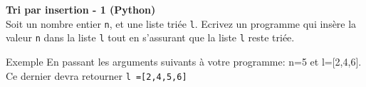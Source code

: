 \begin{Exercice}[10 minutes] \textbf{Tri par insertion - 1 (Python)}\\
    Soit un nombre entier \lstinline{n}, et une liste triée \lstinline{l}. Ecrivez un programme qui insère la valeur \lstinline{n} dans la liste \lstinline{l} tout en s'assurant que la liste \lstinline{l} reste triée.

    \begin{Example}{\faTerminal \quad Exemple}
        En passant les arguments suivants à votre programme: n=5 et l=[2,4,6]. Ce dernier devra retourner \lstinline{l =[2,4,5,6]}
    \end{Example}

    \begin{solution}
        
    \end{solution}


\end{Exercice}

